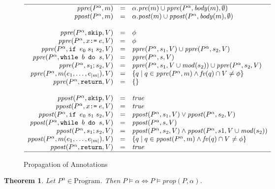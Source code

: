 \documentclass[10pt,notitlepage,twoside]{article}
\newcommand{\pre}{\mathit{pre}}
\newcommand{\post}{\mathit{post}}
\newcommand{\ppre}{\mathit{ppre}}
\newcommand{\ppost}{\mathit{ppost}}
\newcommand{\mod}{\mathit{mod}}
\newcommand{\fv}{\mathit{fv}}
\newcommand{\true}{\mathit{true}}
\newtheorem{theorem}{Theorem}
\begin{document}
\begin{figure}
\begin{displaymath}
\begin{array}{rcl}
\hline 
\ppre(P^\alpha,m) & = & \alpha.\pre(m) \cup \ppre(P^\alpha,\mathit{body}(m),\emptyset) \\
\ppost(P^\alpha,m) & = & \alpha.\post(m) \cup \ppost(P^\alpha,\mathit{body}(m),\emptyset) \\
\ \\
\ppre(P^\alpha,\texttt{skip},V) & = & \phi  \\
\ppre(P^\alpha,x \texttt{:=}\; e,V) & = & \phi \\
\ppre(P^\alpha,\texttt{if }e_0\;s_1\;s_2,V) & = & \ppre(P^\alpha,s_1,V) \cup \ppre(P^\alpha,s_2,V) \\
\ppre(P^\alpha,\texttt{while }b\texttt{ do }s,V) & = & \ppre(P^\alpha,s,V) \\
\ppre(P^\alpha,s_1; s_2,V) & = & \ppre(P^\alpha,s_1,V\cup\mod(s_2)) \cup \ppre(P^\alpha,s_2,V)  \\
\ppre(P^\alpha,m(e_1,\ldots,e_{|m|}),V) & = & \{ q \mid q \in \ppre(P^\alpha,m) \wedge \fv(q) \cap V \neq \phi  \} \\
\ppre(P^\alpha,\texttt{return},V) & = & \{ \}  \\
\ \\
\ppost(P^\alpha,\texttt{skip},V) & = & \true  \\
\ppost(P^\alpha,x \texttt{:=}\; e,V) & = & \true \\
\ppost(P^\alpha,\texttt{if }e_0\;s_1\;s_2,V) & = & \ppost(P^\alpha,s_1,V) \vee \ppost(P^\alpha,s_2,V) \\
\ppost(P^\alpha,\texttt{while }b\texttt{ do }s,V) & = & \ppost(P^\alpha,s,V)  \\
\ppost(P^\alpha,s_1; s_2,V) & = & \ppost(P^\alpha,s_2,V) \wedge \ppost(P^\alpha,s1,V\cup\mod(s_2))  \\
\ppost(P^\alpha,m(e_1,\ldots,e_{|m|}),V) & = & \{ q \mid q \in \ppost(P^\alpha,m) \wedge \fv(q) \cap V \neq \phi   \}\\
\ppost(P^\alpha,\texttt{return},V) & = & \true \\
\hline
\end{array}
\end{displaymath}
\caption{Propagation of Annotations}\label{fig:propagation}
\end{figure}

\begin{theorem}
Let $P^\alpha \in \overline{\textrm{Program}}$. Then 
$P \models \alpha \Leftrightarrow P \models \mathit{prop}(P,\alpha)$.
\end{theorem}
\end{document}
